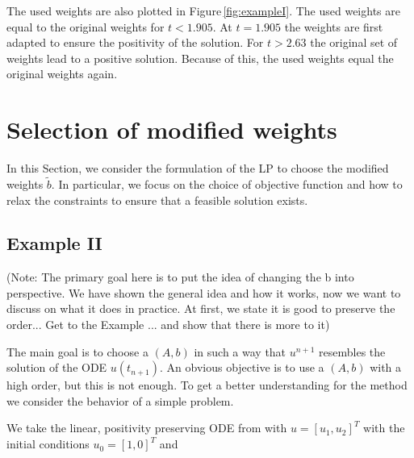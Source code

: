 \documentclass[a4paper]{article}
\numberwithin{equation}{section}
\theoremstyle{plain}
\theoremstyle{definition}
\numberwithin{theorem}{section}
\newcommand{\1}{\mathbbm{1}}
\newcommand{\bt}{\tilde{b}}
\begin{document}
The used weights are also plotted in Figure\,\ref{fig:exampleI}. 
The used weights are equal to the original weights for $t<1.905$. At $t=1.905$ the weights are first adapted to ensure the positivity of the solution. For $t>2.63$ the original set of weights lead to a positive solution. Because of this, the used weights equal the original weights again.


\section{Selection of modified weights}\label{sec:LP}

In this Section, we consider the formulation of the LP to choose
the modified weights $\bt$.  In particular, we focus on the choice
of objective function and how to relax the constraints to ensure that
a feasible solution exists.

\subsection{Example II}\label{sec:example_lin}

(Note: The primary goal here is to put the idea of changing the b into perspective. We have shown the general idea and how it works, now we want to discuss on what it does in practice. At first, we state it is good to preserve the order... Get to the Example ... and show that there is more to it)


The main goal is to choose a $(A,b)$ in such a way that $u^{n+1}$ resembles the solution of the ODE $u(t_{n+1})$. 
An obvious objective is to use a $(A,b)$ with a high order, but this is not enough.
To get a better understanding for the method we consider the behavior of a simple problem.   

We take the linear, positivity preserving ODE from \cite{kopecz_unconditionally_2018} with $u = [u_1,u_2]^T$ with the initial conditions $u_0 = [1,0]^T$ and
\end{document}
